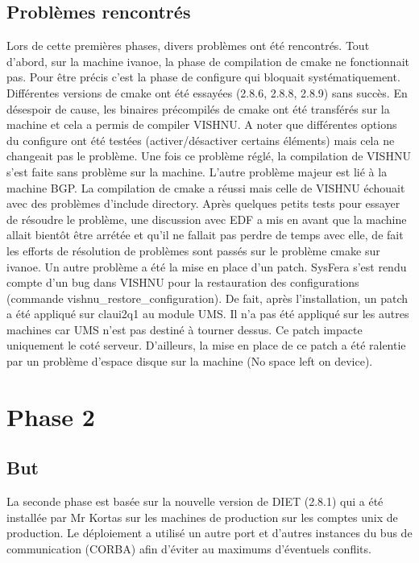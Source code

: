 \documentclass{article}
\begin{document}
\subsection{Probl\`emes rencontr\'es}
Lors de cette premi\`eres phases, divers probl\`emes ont \'et\'e rencontr\'es.
Tout d'abord, sur la machine ivanoe, la phase de compilation de cmake ne 
fonctionnait pas. Pour \^etre pr\'ecis c'est la phase de configure qui bloquait
syst\'ematiquement. Diff\'erentes versions de cmake ont \'et\'e essay\'ees (2.8.6,
2.8.8, 2.8.9) sans succ\`es. En d\'esespoir de cause, les binaires
pr\'ecompil\'es de cmake ont \'et\'e transf\'er\'es sur la machine et
cela a permis de compiler VISHNU. A noter que diff\'erentes options du
configure ont \'et\'e test\'ees (activer/d\'esactiver certains \'el\'ements)
mais cela ne changeait pas le probl\`eme. Une fois ce probl\`eme r\'egl\'e,
la compilation de VISHNU s'est faite sans probl\`eme sur la machine.
L'autre probl\`eme majeur est li\'e \`a la machine BGP. La compilation de 
cmake a r\'eussi mais celle de VISHNU \'echouait avec des probl\`emes d'include
directory. Apr\`es quelques petits tests pour essayer de r\'esoudre
le probl\`eme, une discussion avec EDF a mis en avant que la machine
allait bient\^ot \^etre arr\'et\'ee et qu'il ne fallait pas perdre
de temps avec elle, de fait les efforts de r\'esolution de probl\`emes
sont pass\'es sur le probl\`eme cmake sur ivanoe.
Un autre probl\`eme a \'et\'e la mise en place d'un patch. SysFera s'est 
rendu compte d'un bug dans VISHNU pour la restauration des configurations
(commande vishnu\_restore\_configuration). De fait, apr\`es l'installation,
un patch a \'et\'e appliqu\'e sur claui2q1 au module UMS. Il n'a pas \'et\'e
appliqu\'e sur les autres machines car UMS n'est pas destin\'e \`a tourner 
dessus. Ce patch impacte uniquement le cot\'e serveur.
D'ailleurs, la mise en place de ce patch a \'et\'e ralentie
par un probl\`eme d'espace disque sur la machine (No space left on device).

\section{Phase 2}
\subsection{But}
La seconde phase est bas\'ee sur la nouvelle version de DIET (2.8.1)
qui a \'et\'e install\'ee par Mr Kortas sur les machines de 
production sur les comptes unix de production. Le déploiement a utilis\'e
un autre port et d'autres instances du bus de communication (CORBA)
afin d'\'eviter au maximums d'\'eventuels conflits.
\end{document}
